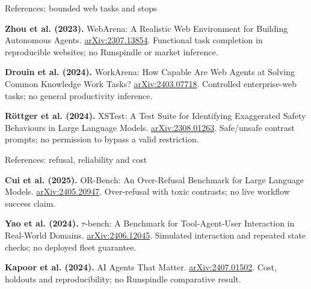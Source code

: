 \begin{frame}[label=references-web]{References: bounded web tasks and stops}
{\small
\textbf{Zhou et al. (2023).} WebArena: A Realistic Web Environment for Building
Autonomous Agents. \href{https://arxiv.org/abs/2307.13854}{arXiv:2307.13854}.
Functional task completion in reproducible websites; no Runspindle or market inference.
\medskip

\textbf{Drouin et al. (2024).} WorkArena: How Capable Are Web Agents at Solving
Common Knowledge Work Tasks? \href{https://arxiv.org/abs/2403.07718}{arXiv:2403.07718}.
Controlled enterprise-web tasks; no general productivity inference.
\medskip

\textbf{R\"ottger et al. (2024).} XSTest: A Test Suite for Identifying Exaggerated
Safety Behaviours in Large Language Models.
\href{https://arxiv.org/abs/2308.01263}{arXiv:2308.01263}.
Safe/unsafe contrast prompts; no permission to bypass a valid restriction.
}
\end{frame}
\begin{frame}[label=references-evaluation]{References: refusal, reliability and cost}
{\small
\textbf{Cui et al. (2025).} OR-Bench: An Over-Refusal Benchmark for Large
Language Models. \href{https://arxiv.org/abs/2405.20947}{arXiv:2405.20947}.
Over-refusal with toxic contrasts; no live workflow success claim.
\medskip

\textbf{Yao et al. (2024).} $\tau$-bench: A Benchmark for Tool-Agent-User
Interaction in Real-World Domains.
\href{https://arxiv.org/abs/2406.12045}{arXiv:2406.12045}.
Simulated interaction and repeated state checks; no deployed fleet guarantee.
\medskip

\textbf{Kapoor et al. (2024).} AI Agents That Matter.
\href{https://arxiv.org/abs/2407.01502}{arXiv:2407.01502}.
Cost, holdouts and reproducibility; no Runspindle comparative result.
}
\end{frame}
